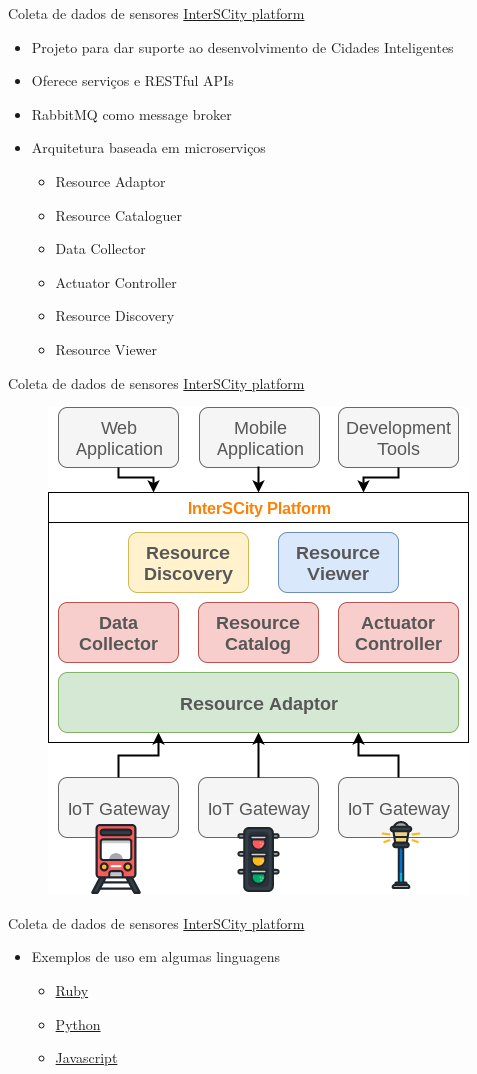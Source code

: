 \documentclass[t]{beamer}
\begin{document}
\begin{frame}{Coleta de dados de sensores}
\href{http://interscity.org/software/interscity-platform/}{InterSCity platform}
\begin{itemize}
	\item Projeto para dar suporte ao desenvolvimento de Cidades Inteligentes
	\item Oferece serviços e RESTful APIs
	\item RabbitMQ como message broker
	\item Arquitetura baseada em microserviços
	\begin{itemize}
		\item Resource Adaptor
		\item Resource Cataloguer
		\item Data Collector
		\item Actuator Controller
		\item Resource Discovery
		\item Resource Viewer
	\end{itemize}
\end{itemize}
\end{frame}

\begin{frame}{Coleta de dados de sensores}
\href{http://interscity.org/software/interscity-platform/}{InterSCity platform}
\begin{figure}
	\includegraphics[width=0.5\linewidth]{interscityarquitetura}
\end{figure}
\end{frame}

\begin{frame}{Coleta de dados de sensores}
\href{http://interscity.org/software/interscity-platform/}{InterSCity platform}
\begin{itemize}
	\item Exemplos de uso em algumas linguagens
	\begin{itemize}
		\item \href{https://github.com/LSS-USP/interscity-examples/blob/master/ruby/README.md}{Ruby}
		\item \href{https://github.com/LSS-USP/interscity-examples/blob/master/python/README.md}{Python}
		\item \href{https://github.com/LSS-USP/interscity-examples/blob/master/javascript/README.md}{Javascript}
	\end{itemize}
\end{itemize}
\end{frame}
\end{document}
